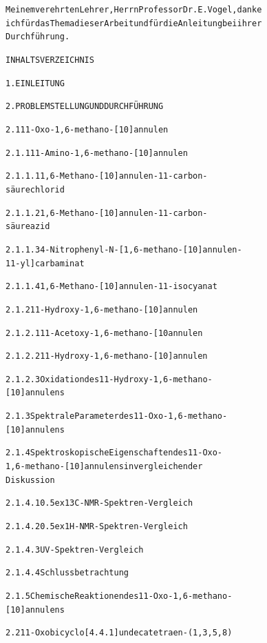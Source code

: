 \documentclass[a4paper,11pt]{article}
\begin{document}
\begin{alltt}
Meinem verehrten Lehrer, Herrn Professor Dr. E. Vogel, danke
ich für das Thema dieser Arbeit und für die Anleitung bei ihrer
Durchführung.
\newpage
\singlespacing
{}


INHALTSVERZEICHNIS

1. EINLEITUNG 

2. PROBLEMSTELLUNG UND DURCHFÜHRUNG 

2.1  11-Oxo-1,6-methano-[10]annulen

     2.1.1  11-Amino-1,6-methano-[10]annulen

            2.1.1.1  1‚6-Methano-[10]annulen-11-carbon-
                     säurechlorid

            2.1.1.2  1,6-Methano-[10]annulen-11-carbon-
                     säureazid

            2.1.1.3  4-Nitrophenyl-N-[1‚6-methano-[10]annulen-
                     11-yl]carbaminat

            2.1.1.4 1,6-Methano-[10]annulen-11-isocyanat

     2.1.2  11-Hydroxy-1,6-methano-[10]annulen

            2.1.2.1  11-Acetoxy-1,6-methano-[10annulen

            2.1.2.2  11-Hydroxy-1‚6-methano-[10]annulen

            2.1.2.3  Oxidation des 11-Hydroxy-1,6-methano-
                     [10]annulens

     2.1.3  Spektrale Parameter des 11-Oxo-1‚6-methano-
            [10]annulens

     2.1.4  Spektroskopische Eigenschaften des 11-Oxo-
            1,6-methano-[10]annulens in vergleichender
            Diskussion 

            2.1.4.1  \raise0.5ex\hbox{13}C-NMR-Spektren-Vergleich

            2.1.4.2  \raise0.5ex\hbox{1}H-NMR-Spektren-Vergleich

            2.1.4.3  UV-Spektren-Vergleich 

            2.1.4.4  Schlussbetrachtung

     2.1.5  Chemische Reaktionen des 11-Oxo-1,6-methano-
            [10]annulens

2.2  11-Oxobicyclo[4.4.1]undecatetraen-(1‚3,5,8)


\end{alltt}
\end{document}
